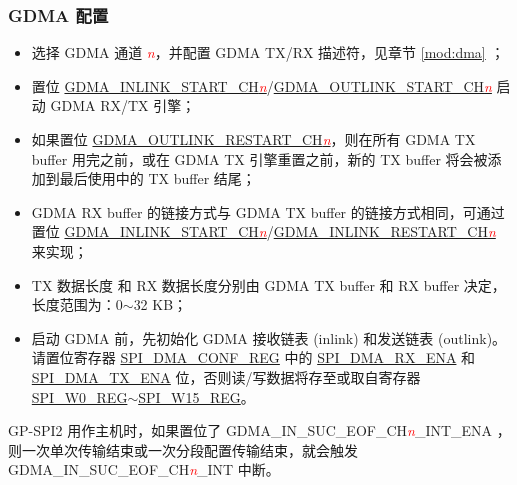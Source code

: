 \documentclass[main\_\_CN.tex]{subfiles}
\begin{document}
\subsubsection{GDMA 配置}\label{sec:DMA-conf}


\begin{itemize}
    \item 选择 GDMA 通道 \textcolor{red}{\it{n}}，并配置 GDMA TX/RX 描述符，见章节 \ref{mod:dma} \textit{}；

    \item 置位 \hyperref[fielddesc:GDMAINLINKSTARTCHN]{GDMA\_INLINK\_START\_CH\textcolor{red}{\it{n}}}/\hyperref[fielddesc:GDMAOUTLINKSTARTCHN]{GDMA\_OUTLINK\_START\_CH\textcolor{red}{\it{n}}}  启动 GDMA RX/TX 引擎；

    \item 如果置位 \hyperref[fielddesc:GDMAOUTLINKRESTARTCHN]{GDMA\_OUTLINK\_RESTART\_CH\textcolor{red}{\it{n}}}，则在所有 GDMA TX buffer 用完之前，或在 GDMA TX 引擎重置之前，新的 TX buffer 将会被添加到最后使用中的 TX buffer 结尾；

    \item GDMA RX buffer 的链接方式与 GDMA TX buffer 的链接方式相同，可通过置位 \hyperref[fielddesc:GDMAINLINKSTARTCHN]{GDMA\_INLINK\_START\_CH\textcolor{red}{\it{n}}}/\hyperref[fielddesc:GDMAINLINKRESTARTCHN]{GDMA\_INLINK\_RESTART\_CH\textcolor{red}{\it{n}}} 来实现；

    \item TX 数据长度 和 RX 数据长度分别由 GDMA TX buffer 和 RX buffer 决定，长度范围为：0$\sim$32 KB；

    \item 启动 GDMA 前，先初始化 GDMA 接收链表 (inlink) 和发送链表 (outlink)。请置位寄存器 \hyperref[regdesc:SPIDMACONFREG]{SPI\_DMA\_CONF\_REG} 中的 \hyperref[fielddesc:SPIDMARXENA]{SPI\_DMA\_RX\_ENA} 和 \hyperref[fielddesc:SPIDMATXENA]{SPI\_DMA\_TX\_ENA} 位，否则读/写数据将存至或取自寄存器 \hyperref[regdesc:SPIW0REG]{SPI\_W0\_REG}$\sim$\hyperref[regdesc:SPIW15REG]{SPI\_W15\_REG}。

\end{itemize}

GP-SPI2 用作主机时，如果置位了 GDMA\_IN\_SUC\_EOF\_CH\textcolor{red}{\it{n}}\_INT\_ENA ，则一次单次传输结束或一次分段配置传输结束，就会触发 GDMA\_IN\_SUC\_EOF\_CH\textcolor{red}{\it{n}}\_INT  中断。
\end{document}
